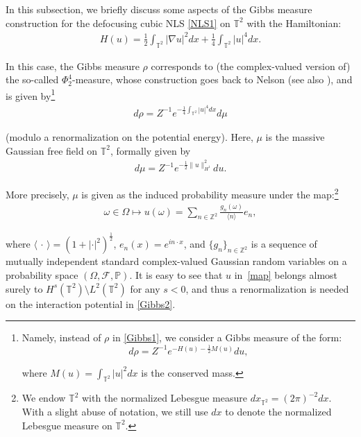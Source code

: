 \documentclass[%
11pt,  reqno]{amsart}
\newcommand{\1}{\hspace{0.2mm}\text{I}\hspace{0.2mm}}
\newcommand{\noi}{\noindent}
\newcommand{\Z}{\mathbb{Z}}
\newcommand{\T}{\mathbb{T}}
\newcommand{\F}{\mathcal{F}}
\newcommand{\ft}{\widehat}
\renewcommand{\o}{\omega}
\renewcommand{\O}{\Omega}
\newcommand{\jb}[1]
{\langle #1 \rangle}
\numberwithin{equation}{section}
\numberwithin{theorem}{section}
\begin{document}
\smallskip




In this subsection, we briefly discuss  
some aspects of
  the Gibbs measure construction
for 
 the defocusing cubic NLS \eqref{NLS1} on $\T^2$
 with the Hamiltonian:
\begin{align*}
H(u) = \frac{1}{2} \int_{\T^2} |\nabla u |^2 dx + \frac{1}{4}\int_{\T^2} |u|^4 dx. 
\end{align*}

\noi
In this case, the Gibbs measure $\rho$
corresponds to (the complex-valued version of)
the so-called $\Phi^4_2$-measure, 
whose construction goes back to 
 Nelson \cite{Nelson}
(see also \cite{DT, OTh1}), 
and is 
given by\footnote{Namely, 
instead of $\rho$ in \eqref{Gibbs1}, 
we consider a Gibbs measure of the form:  
\begin{equation*} 
d \rho = Z^{-1} e^{- H(u) - \frac 12 M(u)}  d u, 
\end{equation*}

\noi
where  $M(u) = \int_{\T^2}|u|^2 dx$ is the conserved mass.}
\begin{align}
d\rho = Z^{-1} e^{- \frac 14 \int_{\T^2} |u|^4 dx} d\mu
\label{Gibbs2}
\end{align} 
 
\noi
(modulo a renormalization on the potential energy).
Here, $\mu$ is the massive Gaussian free field on $\T^2$, 
formally given by 
\begin{align}\label{gauss0}
d \mu 
= Z^{-1} e^{-\frac 12 \| u\|_{H^{1} }^2    } du.
\end{align}

\noi
More precisely, 
$\mu$ is given as the induced probability measure under the map:\footnote{We endow $\T^2$  
 with the normalized Lebesgue measure $dx_{\T^2}=(2\pi)^{-2}dx$. With a slight abuse of notation, we still use $dx$ to denote the normalized Lebesgue measure on $\T^2$.}
\begin{align}
\o\in \O \longmapsto u(\o) = \sum_{n \in \Z^2 } \frac{ g_n(\o)}{\jb{n}} e_n, 
\label{map}
\end{align}



%


\noi
where 
$\jb{\,\cdot\,} = (1+|\cdot|^2)^\frac{1}{2}$, 
$e_n(x) = e^{i n\cdot x}$, 
and $\{ g_n \}_{n \in \Z^2}$
is a sequence of mutually independent standard complex-valued
Gaussian random variables on a probability space 
$(\O,\F,\mathbb P)$.
It is easy to see that $u$ in~\eqref{map} 
belongs almost surely to $H^s(\T^2) \setminus L^2(\T^2)$
for any $s < 0$, 
and thus 
 a renormalization 
 is needed
 on the interaction potential in \eqref{Gibbs2}.
\end{document}
